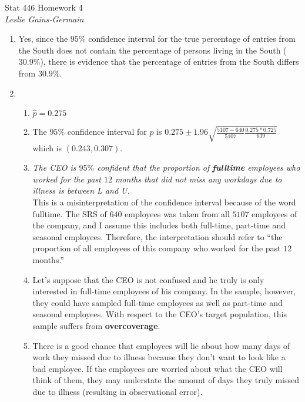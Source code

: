 \documentclass[11pt]{article}
\begin{document}
\begin{flushleft}
{\sc \Large Stat 446 Homework 4 } \hfill \\
\bigskip
{\it Leslie Gains-Germain}
\end{flushleft}

\begin{doublespace}


\begin{enumerate}
 
\item Yes, since the $95\%$ confidence interval for the true percentage of entries from the South does not contain the percentage of persons living in the South ($30.9\%$), there is evidence that the percentage of entries from the South differs from $30.9\%$. 

\item \begin{enumerate}
\item $\hat{p}=0.275$
\item The $95\%$ confidence interval for $p$ is $0.275 \pm 1.96\sqrt{\frac{5107-640}{5107}\frac{0.275*0.725}{639}}$ which is $(0.243, 0.307)$.
\item {\it The CEO is $95\%$ confident that the proportion of {\bf fulltime} employees who worked for the past $12$ months that did not miss any workdays due to illness is between L and U.} \\

This is a misinterpretation of the confidence interval because of the word fulltime. The SRS of $640$ employees was taken from all $5107$ employees of the company, and I assume this includes both full-time, part-time and seasonal employees. Therefore, the interpretation should refer to ``the proportion of all employees of this company who worked for the past $12$ months.''

\item Let's suppose that the CEO is not confused and he truly is only interested in full-time employees of his company. In the sample, however, they could have sampled full-time employees as well as part-time and seasonal employees. With respect to the CEO's target population, this sample suffers from {\bf overcoverage}.

\item There is a good chance that employees will lie about how many days of work they missed due to illness because they don't want to look like a bad employee. If the employees are worried about what the CEO will think of them, they may understate the amount of days they truly missed due to illness (resulting in observational error).


\end{enumerate}
\end{enumerate}
\end{doublespace}
\end{document}
